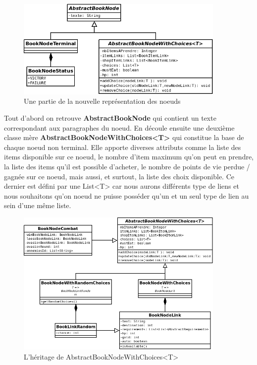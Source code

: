 			\begin{figure}[H]
				\centering\includegraphics[width=0.90\textwidth, keepaspectratio]{img/BookNode1.png}
				\caption{Une partie de la nouvelle représentation des noeuds}
				\label{fig:BookNode}
			\end{figure}

			Tout d'abord on retrouve \textbf{AbstractBookNode} qui contient un texte correspondant aux paragraphes du noeud. En découle ensuite une deuxième classe mère \textbf{AbstractBookNodeWithChoices<T>} qui constitue la base de chaque noeud non terminal. Elle apporte diverses attributs comme la liste des items disponible sur ce noeud, le nombre d'item maximum qu'on peut en prendre, la liste des items qu'il est possible d'acheter, le nombre de points de vie perdue / gagnée sur ce noeud, mais aussi, et surtout, la liste des choix disponible. Ce dernier est défini par une List<T> car nous aurons différents type de liens et nous souhaitons qu'on noeud ne puisse posséder qu'un et un seul type de lien au sein d'une même liste.

			\begin{figure}[H]
				\centering\includegraphics[width=0.90\textwidth, keepaspectratio]{img/BookNode2.png}
				\caption{L'héritage de AbstractBookNodeWithChoices<T>}
				\label{fig:BookNode}
			\end{figure}

